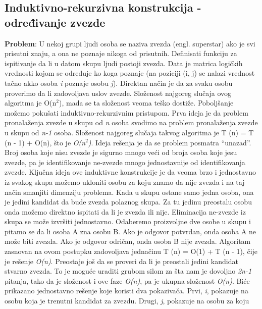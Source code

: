 \documentclass{article}
\begin{document}
\subsection{Induktivno-rekurzivna konstrukcija - određivanje zvezde}
\textbf{Problem}: U nekoj grupi ljudi osoba se naziva zvezda (engl. superstar) ako je
svi prisutni znaju, a ona ne poznaje nikoga od prisutnih. Definisati funkciju za
ispitivanje da li u datom skupu ljudi postoji zvezda. Data je matrica logičkih
vrednosti kojom se određuje ko koga poznaje (na poziciji (i, j) se nalazi vrednost
tačno akko osoba \textit{i} poznaje osobu \textit{j}).
\newline Direktan način je da za svaku osobu proverimo da li zadovoljava uslov zvezde. Složenost najgoreg slučaja ovog algoritma je O(n$^2$), mada se ta
složenost veoma teško dostiže.
\newline Poboljšanje možemo pokušati induktivno-rekurzivnim pristupom. Prva ideja
je da problem pronalaženja zvezde u skupu od \textit{n} osoba svodimo na problem pronalaženja zvezde u skupu od \textit{n-1} osoba. Složenost najgoreg slučaja takvog algoritma je T (n) = T (n - 1) + O(n), što je \textit{O(n$^2$)}.
\newline Ideja rešenja je da se problem posmatra “unazad”. Broj osoba koje nisu zvezde
je sigurno mnogo veći od broja osoba koje jesu zvezde, pa je identifikovanje
ne-zvezde mnogo jednostavnije od identifikovanja zvezde. Ključna ideja ove induktivne konstrukcije je da veoma brzo i jednostavno  iz svakog skupa možemo ukloniti osobu za koju znamo da nije zvezda
i na taj način smanjiti dimenziju problema. Kada u skupu ostane samo jedna
osoba, ona je jedini kandidat da bude zvezda polaznog skupa. Za
tu jedinu preostalu osobu onda možemo direktno ispitati da li je zvezda ili nije.
Eliminacija ne-zvezde iz skupa se može izvršiti jednostavno. Odaberemo
proizvoljne dve osobe u skupu i pitamo se da li osoba A zna osobu B. Ako
je odgovor potvrdan, onda osoba A ne može biti zvezda. Ako je odgovor odričan, onda osoba B nije zvezda. Algoritam zasnovan na ovom postupku zadovoljava jednačinu
T (n) = O(1) + T (n - 1), čije je rešenje \textit{O(n)}. Preostaje još da se proveri da li je preostali jedini kandidat stvarno zvezda. To je moguće uraditi grubom silom za šta nam je dovoljno \textit{2n-1} pitanja, tako da je složenost i ove
faze \textit{O(n)}, pa je ukupna složenost \textit{O(n)}.
\newline Biće prikazano jednostavno rešenje koje koristi dva pokazivača. Prvi, \textit{i}, pokazuje na osobu koja je trenutni kandidat za zvezdu. Drugi, \textit{j}, pokazuje na osobu za koju
\end{document}
